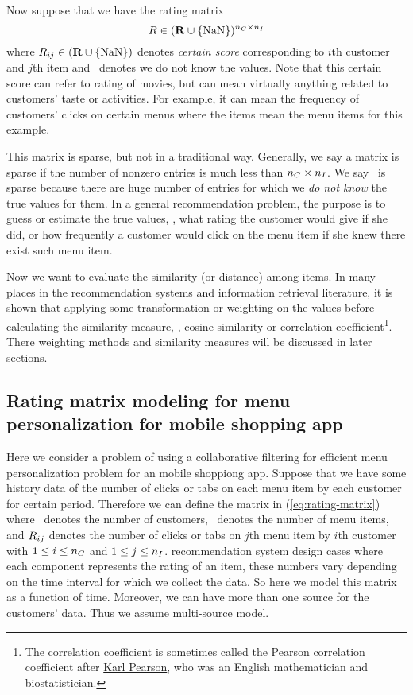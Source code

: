 Now suppose that we have the rating matrix
\begin{equation}
\label{eq:rating-matrix}
R \in (\mathbf{R}\cup\{\mathrm{NaN}\})^{{n_C} \times {n_I}}
\end{equation}
where $R_{ij} \in (\mathbf{R}\cup\{\mathrm{NaN}\})$ denotes \emph{certain score} corresponding to $i$th customer and $j$th item
and \nan\ denotes we do not know the values.
Note that this {certain score} can refer to rating of movies, but can mean virtually anything related to customers'
taste or activities. For example, it can mean the frequency of customers' clicks on certain menus
where the items mean the menu items for this example.

This matrix is sparse, but not in a traditional way. Generally, we say a matrix is sparse if the number of nonzero entries
is much less than ${n_C} \times {n_I}$. We say \ratmat\ is sparse because there are huge number of entries
for which we \emph{do not know} the true values for them.
In a general recommendation problem, the purpose is to guess or estimate the true values,
\eg, what rating the customer would give if she did, or how frequently a customer would click on the menu item if she knew
there exist such menu item.

Now we want to evaluate the similarity (or distance) among items.
In many places in the recommendation systems and information retrieval literature,
it is shown that applying some transformation or weighting on the values
before calculating the similarity measure,
\eg, \href{https://en.wikipedia.org/wiki/Cosine_similarity}{cosine similarity}
or \href{https://en.wikipedia.org/wiki/Correlation_coefficient}{correlation coefficient}\footnote{
    The correlation coefficient is sometimes called the Pearson correlation coefficient
    after \href{https://en.wikipedia.org/wiki/Karl_Pearson}{Karl Pearson}, who was an English mathematician and biostatistician.
}.
There weighting methods and similarity measures will be discussed in later sections.

\subsection{Rating matrix modeling for menu personalization for mobile shopping app}

Here we consider a problem of using a collaborative filtering for efficient menu personalization problem for an mobile shoppiong app.
Suppose that we have some history data of the number of clicks or tabs on each menu item by each customer for certain period.
Therefore we can define the matrix in (\ref{eq:rating-matrix})
where
\numcus\ denotes the number of customers,
\numitem\ denotes the number of menu items,
and
$R_{ij}$ denotes the number of clicks or tabs on $j$th menu item by $i$th customer
with $1\leq i\leq {n_C}$ and $1\leq j\leq {n_I}$.
recommendation system design cases where each component represents the rating of an item,
these numbers vary depending on the time interval for which we collect the data.
So here we model this matrix as a function of time.
Moreover, we can have more than one source for the customers' data.
Thus we assume multi-source model.

